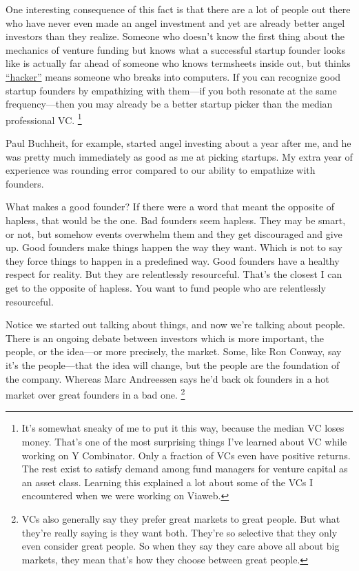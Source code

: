 One interesting consequence of this fact is that there are a lot of
people out there who have never even made an angel investment and yet
are already better angel investors than they realize. Someone who
doesn't know the first thing about the mechanics of venture funding but
knows what a successful startup founder looks like is actually far ahead
of someone who knows termsheets inside out, but thinks
\href{gba.html}{``hacker''} means someone who breaks into computers. If
you can recognize good startup founders by empathizing with them---if
you both resonate at the same frequency---then you may already be a
better startup picker than the median professional VC.
\footnote{It's somewhat sneaky of me to put it this way, because the
median VC loses money. That's one of the most surprising things I've
learned about VC while working on Y Combinator. Only a fraction of VCs
even have positive returns. The rest exist to satisfy demand among fund
managers for venture capital as an asset class. Learning this explained
a lot about some of the VCs I encountered when we were working on
Viaweb.}

Paul Buchheit, for example, started angel investing about a year after
me, and he was pretty much immediately as good as me at picking
startups. My extra year of experience was rounding error compared to our
ability to empathize with founders.

What makes a good founder? If there were a word that meant the opposite
of hapless, that would be the one. Bad founders seem hapless. They may
be smart, or not, but somehow events overwhelm them and they get
discouraged and give up. Good founders make things happen the way they
want. Which is not to say they force things to happen in a predefined
way. Good founders have a healthy respect for reality. But they are
relentlessly resourceful. That's the closest I can get to the opposite
of hapless. You want to fund people who are relentlessly resourceful.

Notice we started out talking about things, and now we're talking about
people. There is an ongoing debate between investors which is more
important, the people, or the idea---or more precisely, the market.
Some, like Ron Conway, say it's the people---that the idea will change,
but the people are the foundation of the company. Whereas Marc
Andreessen says he'd back ok founders in a hot market over great
founders in a bad one. \footnote{VCs also generally say they prefer great markets to great
people. But what they're really saying is they want both. They're so
selective that they only even consider great people. So when they say
they care above all about big markets, they mean that's how they choose
between great people.}

